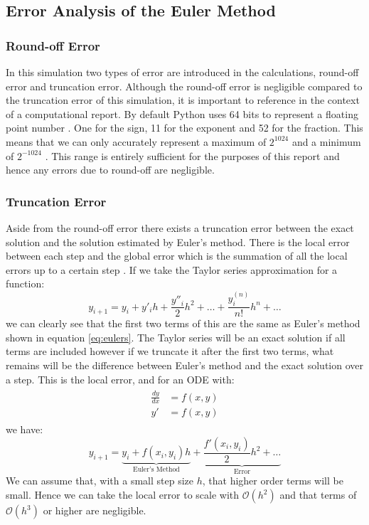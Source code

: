 \documentclass[reprint, amsmath, amssymb, aps]{revtex4-2}
\begin{document}
\subsection{Error Analysis of the Euler Method}
\subsubsection{Round-off Error}
In this simulation two types of error are introduced in the calculations, round-off error and truncation error. Although the round-off error is negligible compared to the truncation error of this simulation, it is important to reference in the context of a computational report. By default Python uses 64 bits to represent a floating point number \cite{python}. One for the sign, 11 for the exponent and 52 for the fraction. This means that we can only accurately represent a maximum of $2^{1024}$ and a minimum of $2^{-1024}$ \cite{niels}. This range is entirely sufficient for the purposes of this report and hence any errors due to round-off are negligible.

\subsubsection{Truncation Error}
Aside from the round-off error there exists a truncation error between the exact solution and the solution estimated by Euler's method. There is the local error between each step and the global error which is the summation of all the local errors up to a certain step \cite{owkes}. If we take the Taylor series approximation for a function:
\begin{equation}
	y_{i+1} = y_{i} + y'_{i}h + \frac{y''_i}{2} h^2 + \dots + \frac{y_i^{(n)}}{n!} h^n + \dots
\end{equation}we can clearly see that the first two terms of this are the same as Euler's method shown in equation \ref{eq:eulers}. The Taylor series will be an exact solution if all terms are included however if we truncate it after the first two terms, what remains will be the difference between Euler's method and the exact solution over a step. This is the local error, and for an ODE with:
\begin{align*}
	\begin{aligned}
	\frac{dy}{dx} &= f(x,y)\\
	y' &= f(x,y)
	\end{aligned}
\end{align*}we have:
\begin{equation}
	y_{i+1} = \underbrace{y_i + f(x_i, y_i) h}_\text{Euler's Method} + \underbrace{\frac{f'(x_i,y_i)}{2}h^2 + \dots}_\text{Error}
\end{equation}We can assume that, with a small step size $h$, that higher order terms will be small. Hence we can take the local error to scale with $\mathcal{O}(h^2)$ and that terms of $\mathcal{O}(h^3)$ or higher are negligible.\\
\end{document}
